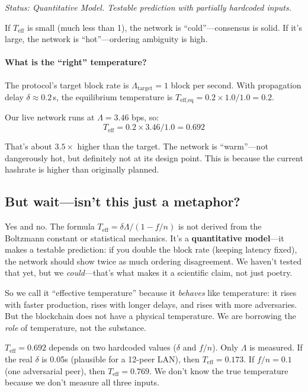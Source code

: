 \documentclass[11pt,a4paper]{article}
\begin{document}
\emph{Status: \textcolor{hardcoded}{Quantitative Model}. Testable prediction with partially hardcoded inputs.}

If $T_{\text{eff}}$ is small (much less than 1), the network is ``cold''---consensus is solid. If it's large, the network is ``hot''---ordering ambiguity is high.

\paragraph{What is the ``right'' temperature?} The protocol's target block rate is $\Lambda_{\text{target}} = 1$ block per second. With propagation delay $\delta \approx 0.2\,$s, the equilibrium temperature is $T_{\text{eff,eq}} = 0.2 \times 1.0 / 1.0 = 0.2$.

Our live network runs at $\Lambda = 3.46$ bps, so:
\[
T_{\text{eff}} = 0.2 \times 3.46 / 1.0 = 0.692
\]

That's about $3.5\times$ higher than the target. The network is ``warm''---not dangerously hot, but definitely not at its design point. This is because the current hashrate is higher than originally planned.

\subsection{But wait---isn't this just a metaphor?}

Yes and no. The formula $T_{\text{eff}} = \delta\Lambda/(1-f/n)$ is not derived from the Boltzmann constant or statistical mechanics. It's a \textbf{quantitative model}---it makes a testable prediction: if you double the block rate (keeping latency fixed), the network should show twice as much ordering disagreement. We haven't tested that yet, but we \emph{could}---that's what makes it a scientific claim, not just poetry.

So we call it ``effective temperature'' because it \emph{behaves} like temperature: it rises with faster production, rises with longer delays, and rises with more adversaries. But the blockchain does not have a physical temperature. We are borrowing the \emph{role} of temperature, not the substance.

\begin{honesty}
$T_{\text{eff}} = 0.692$ depends on two hardcoded values ($\delta$ and $f/n$). Only $\Lambda$ is measured. If the real $\delta$ is 0.05s (plausible for a 12-peer LAN), then $T_{\text{eff}} = 0.173$. If $f/n = 0.1$ (one adversarial peer), then $T_{\text{eff}} = 0.769$. We don't know the true temperature because we don't measure all three inputs.
\end{honesty}
\end{document}
